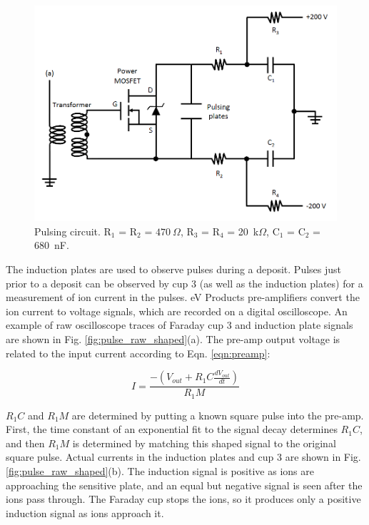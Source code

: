 \begin{figure} %
        \centering
                \includegraphics[width=.85\textwidth]{figures/pulsing_circuit.png}
                \caption{Pulsing circuit.  R$_{1}$ = R$_{2}$ = $470~\Omega$, R$_{3}$ = R$_{4}$ = 20~k$\Omega$, \newline C$_{1}$ = C$_{2}$ = 680~nF. \cite{Shon}}
\label{fig:pulse_circuit}
\end{figure}

The induction plates are used to observe pulses during a deposit.  Pulses just prior to a deposit can be observed by cup 3 (as well as the induction plates) for a measurement of ion current in the pulses.  eV Products pre-amplifiers convert the ion current to voltage signals, which are recorded on a digital oscilloscope.  An example of raw oscilloscope traces of Faraday cup 3 and induction plate signals are shown in Fig. \ref{fig:pulse_raw_shaped}(a).  The pre-amp output voltage is related to the input current according to Eqn. \ref{eqn:preamp}:

\begin{equation}
I = \frac{-(V_{out} + R_{1} C \frac{dV_{out}}{dt})}{R_{1} M}
\label{eqn:preamp}
\end{equation}

\noindent
$R_{1} C$ and $R_{1} M$ are determined by putting a known square pulse into the pre-amp.  First, the time constant of an exponential fit to the signal decay determines $R_{1} C$, and then $R_{1} M$ is determined by matching this shaped signal to the original square pulse.  Actual currents in the induction plates and cup 3 are shown in Fig. \ref{fig:pulse_raw_shaped}(b).  The induction signal is positive as ions are approaching the sensitive plate, and an equal but negative signal is seen after the ions pass through.  The Faraday cup stops the ions, so it produces only a positive induction signal as ions approach it.

